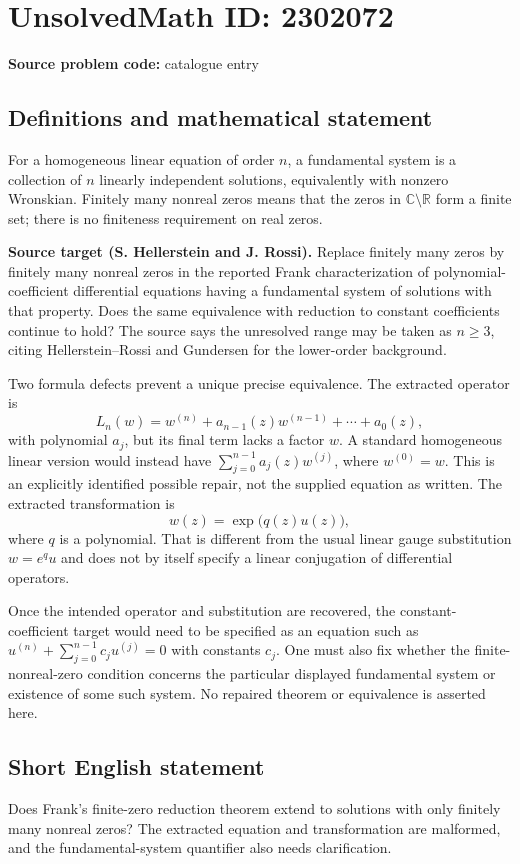 \documentclass[11pt]{article}
\begin{document}
\section*{UnsolvedMath ID: 2302072}
\textbf{Source problem code:} catalogue entry
\subsection{Definitions and mathematical statement}
For a homogeneous linear equation of order $n$, a fundamental system is a collection of $n$ linearly independent solutions, equivalently with nonzero Wronskian. Finitely many nonreal zeros means that the zeros in $\mathbb C\setminus\mathbb R$ form a finite set; there is no finiteness requirement on real zeros.

\textbf{Source target (S. Hellerstein and J. Rossi).} Replace finitely many zeros by finitely many nonreal zeros in the reported Frank characterization of polynomial-coefficient differential equations having a fundamental system of solutions with that property. Does the same equivalence with reduction to constant coefficients continue to hold? The source says the unresolved range may be taken as $n\geq3$, citing Hellerstein--Rossi and Gundersen for the lower-order background.

Two formula defects prevent a unique precise equivalence. The extracted operator is
\[
L_n(w)=w^{(n)}+a_{n-1}(z)w^{(n-1)}+\cdots+a_0(z),
\]
with polynomial $a_j$, but its final term lacks a factor $w$. A standard homogeneous linear version would instead have $\sum_{j=0}^{n-1}a_j(z)w^{(j)}$, where $w^{(0)}=w$. This is an explicitly identified possible repair, not the supplied equation as written. The extracted transformation is
\[
w(z)=\exp\big(q(z)u(z)\big),
\]
where $q$ is a polynomial. That is different from the usual linear gauge substitution $w=e^{q}u$ and does not by itself specify a linear conjugation of differential operators.

Once the intended operator and substitution are recovered, the constant-coefficient target would need to be specified as an equation such as $u^{(n)}+\sum_{j=0}^{n-1}c_ju^{(j)}=0$ with constants $c_j$. One must also fix whether the finite-nonreal-zero condition concerns the particular displayed fundamental system or existence of some such system. No repaired theorem or equivalence is asserted here.
\subsection{Short English statement}
Does Frank's finite-zero reduction theorem extend to solutions with only finitely many nonreal zeros? The extracted equation and transformation are malformed, and the fundamental-system quantifier also needs clarification.
\end{document}
